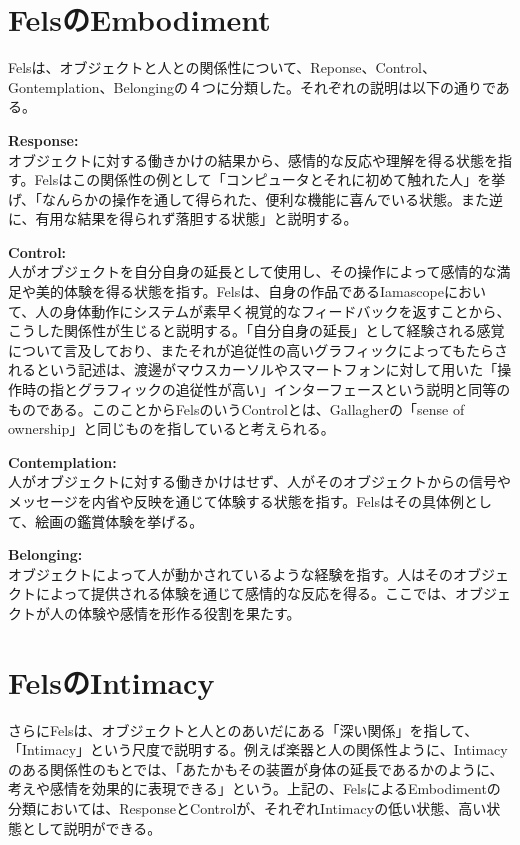 \section{FelsのEmbodiment}
Felsは、オブジェクトと人との関係性について、Reponse、Control、Gontemplation、Belongingの４つに分類した。それぞれの説明は以下の通りである。

\textbf{Response:}\\
オブジェクトに対する働きかけの結果から、感情的な反応や理解を得る状態を指す。Felsはこの関係性の例として「コンピュータとそれに初めて触れた人」を挙げ、「なんらかの操作を通して得られた、便利な機能に喜んでいる状態。また逆に、有用な結果を得られず落胆する状態」と説明する。

\textbf{Control:}\\
人がオブジェクトを自分自身の延長として使用し、その操作によって感情的な満足や美的体験を得る状態を指す。Felsは、自身の作品であるIamascopeにおいて、人の身体動作にシステムが素早く視覚的なフィードバックを返すことから、こうした関係性が生じると説明する。「自分自身の延長」として経験される感覚について言及しており、またそれが追従性の高いグラフィックによってもたらされるという記述は、渡邊がマウスカーソルやスマートフォンに対して用いた「操作時の指とグラフィックの追従性が高い」インターフェースという説明と同等のものである。このことからFelsのいうControlとは、Gallagherの「sense of ownership」と同じものを指していると考えられる。

\textbf{Contemplation:}\\
人がオブジェクトに対する働きかけはせず、人がそのオブジェクトからの信号やメッセージを内省や反映を通じて体験する状態を指す。Felsはその具体例として、絵画の鑑賞体験を挙げる。

\textbf{Belonging:}\\
オブジェクトによって人が動かされているような経験を指す。人はそのオブジェクトによって提供される体験を通じて感情的な反応を得る。ここでは、オブジェクトが人の体験や感情を形作る役割を果たす。

\section{FelsのIntimacy}
さらにFelsは、オブジェクトと人とのあいだにある「深い関係」を指して、「Intimacy」という尺度で説明する。例えば楽器と人の関係性ように、Intimacyのある関係性のもとでは、「あたかもその装置が身体の延長であるかのように、考えや感情を効果的に表現できる」という。上記の、FelsによるEmbodimentの分類においては、ResponseとControlが、それぞれIntimacyの低い状態、高い状態として説明ができる。

